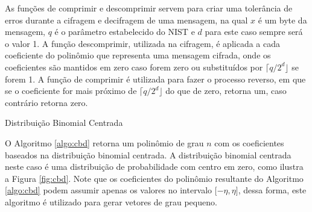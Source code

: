     As funções de comprimir e descomprimir servem para criar uma tolerância de erros durante a cifragem e decifragem de uma mensagem, na qual $x$ é um byte da mensagem, $q$ é o parâmetro estabelecido do \ac{NIST} e $d$ para este caso sempre será o valor 1. A função descomprimir, utilizada na cifragem, é aplicada a cada coeficiente do polinômio que representa uma mensagem cifrada, onde os coeficientes são mantidos em zero caso forem zero ou substituídos por $\lceil q/2^d \rfloor$ se forem 1. A função de comprimir é utilizada para fazer o processo reverso, em que se o coeficiente for mais próximo de $\lceil q/2^d \rfloor$ do que de zero, retorna um, caso contrário retorna zero. 

    \begin{algorithm}[!htbp]
        \SetAlgoLined
        
    
        \caption{Distribuição Binomial Centrada}
        \label{algo:cbd}
    \end{algorithm}
    
    O Algoritmo \ref{algo:cbd} retorna um polinômio de grau $n$ com os coeficientes baseados na distribuição binomial centrada. A distribuição binomial centrada neste caso é uma distribuição de probabilidade com centro em zero, como ilustra a Figura \ref{fig:cbd}. Note que os coeficientes do polinômio resultante do Algoritmo \ref{algo:cbd} podem assumir apenas os valores no intervalo ${[}-\eta,\eta{]}$, dessa forma, este algoritmo é utilizado para gerar vetores de grau pequeno. 


